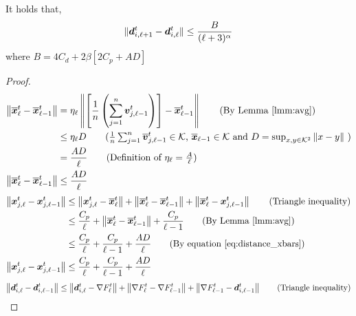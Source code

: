 \begin{claim}
It holds that, 
\begin{equation*}
    \| \bm{d}^t_{i,\ell+1} - \bm{d}^t_{i, \ell} \| \leq \frac{B}{(\ell+3)^{\alpha}} 
\end{equation*}
where $B = 4C_{d} + 2\beta \left[ 2C_{p} + AD \right]$
\end{claim}
\begin{proof}
    \begin{align}
\norm{\overline{\vect{x}}_{\ell}^{t} - \overline{\vect{x}}_{\ell-1}^{t}} &= \eta_{\ell} \norm{ \left[ \frac{1}{n} \left( \sum_{j=1}^{n} \vect{v}_{j,\ell-1}^{t} \right) \right] - \overline{\vect{x}}_{\ell-1}^{t}} \tag{By Lemma~\ref{lmm:avg}} \nonumber\\
%
%
&\leq \eta_{\ell} D \tag{$\frac{1}{n} \sum_{j=1}^{n} \overline{\vect{v}}_{j,\ell-1}^{t} \in \mathcal{K}$,  $\overline{\vect{x}}_{\ell-1} \in \mathcal{K}$ and $D = \sup_{x,y \in \mathcal{K}^2} \norm{x-y}$ }\nonumber\\
%
%
&= \frac{AD}{\ell}\tag{Definition of $\eta_{\ell} = \frac{A}{\ell}$} \\
\norm{\overline{\vect{x}}_{\ell}^{t} - \overline{\vect{x}}_{\ell-1}^{t}} &\leq \frac{AD}{\ell} \label{eq:distance_xbars}
\end{align}
\begin{align}
\norm{\vect{x}_{j,\ell}^{t} - \vect{x}_{j,\ell-1}^{t}} &\leq \norm{ \vect{x}_{j,\ell}^t-\overline{\vect{x}}_{\ell}^{t}} + \norm{\overline{\vect{x}}_{\ell}^{t}-\overline{\vect{x}}_{\ell-1}^{t}} + \norm{\overline{\vect{x}}_{\ell}^{t}-\vect{x}_{j,\ell-1}^{t}} \tag{Triangle inequality}\\
%
%
&\leq \frac{C_p}{\ell}  + \norm{\overline{\vect{x}}_{\ell}^{t} - \overline{\vect{x}}_{\ell-1}^{t}} + \frac{C_p}{\ell-1} \tag{By Lemma~\ref{lmm:avg}} \\
%
%
&\leq \frac{C_p}{\ell} + \frac{C_p}{\ell-1} + \frac{AD}{\ell} \tag{By equation~\ref{eq:distance_xbars}}\\
\norm{\vect{x}_{j,\ell}^{t} - \vect{x}_{j,\ell-1}^{t}} &\leq \frac{C_p}{\ell} + \frac{C_p}{\ell-1} + \frac{AD}{\ell} \label{eq:xjl-xjl-1}
\end{align}
\begin{align}
\norm{\vect{d}_{i,\ell}^{t} - \vect{d}_{i,\ell-1}^{t}} &\leq \norm{\vect{d}_{i,\ell}^{t} - \nabla F_{\ell}^{t}} + \norm{\nabla F_{\ell}^{t} - \nabla F_{\ell-1}^{t}} +\norm{\nabla F_{\ell-1}^{t} - \vect{d}_{i,\ell-1}^{t}} \tag{Triangle inequality}\\

\end{align}
\end{proof}
